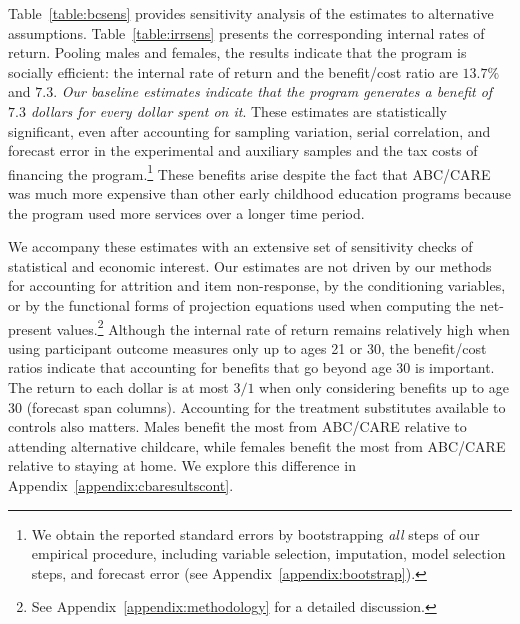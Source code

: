 Table~\ref{table:bcsens} provides sensitivity analysis of the estimates to alternative assumptions. Table~\ref{table:irrsens} presents the corresponding internal rates of return. Pooling males and females, the results indicate that the program is socially efficient: the internal rate of return and the benefit/cost ratio are $13.7\%$ and $7.3$. \textit{Our baseline estimates indicate that the program generates a benefit of $7.3$ dollars for every dollar spent on it}. These estimates are statistically significant, even after accounting for sampling variation, serial correlation, and forecast error in the experimental and auxiliary samples and the tax costs of financing the program.\footnote{We obtain the reported standard errors by bootstrapping \emph{all} steps of our empirical procedure, including variable selection, imputation, model selection steps, and forecast error (see  Appendix~\ref{appendix:bootstrap}).} These benefits arise despite the fact that ABC/CARE was much more expensive than other early childhood education programs because the program used more services over a longer time period.

We accompany these estimates with an extensive set of sensitivity checks of statistical and economic interest. Our estimates are not driven by our methods for accounting for attrition and item non-response, by the conditioning variables, or by the functional forms of projection equations used when computing the net-present values.\footnote{See Appendix~\ref{appendix:methodology} for a detailed discussion.} Although the internal rate of return remains relatively high when using participant outcome measures only up to ages 21 or 30, the benefit/cost ratios indicate that accounting for benefits that go beyond age 30 is important. The return to each dollar is at most $3/1$ when only considering benefits up to age 30 (forecast span columns). Accounting for the treatment substitutes available to controls also matters. Males benefit the most from ABC/CARE relative to attending alternative childcare, while females benefit the most from ABC/CARE relative to staying at home. We explore this difference in Appendix~\ref{appendix:cbaresultscont}.


